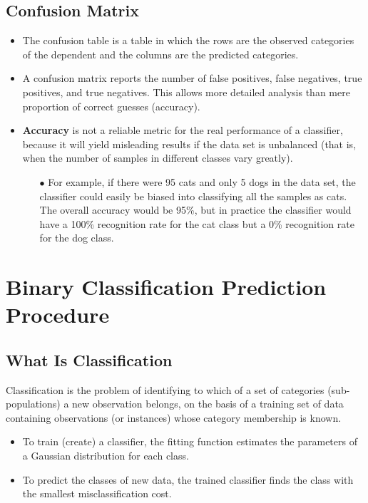 \documentclass[a4paper,12pt]{article}
\begin{document}
\subsection*{Confusion Matrix}
\begin{itemize}
	\item The confusion table is a table in which the rows are the observed categories of
	the dependent and the columns are the predicted categories. 
	\item A confusion matrix reports
	the number of false positives, false negatives, true positives, and true
	negatives. This allows more detailed analysis than mere proportion of correct guesses
	(accuracy). 
	\item \textbf{Accuracy} is not a reliable metric for the real performance of a
	classifier, because it will yield misleading results if the data set is unbalanced
	(that is, when the number of samples in different classes vary greatly).
	\begin{itemize}
		\item[$\bullet$] For example, if there were 95 cats and only 5 dogs in the data set, the
		classifier could easily be biased into classifying all the samples as cats. The
		overall accuracy would be 95\%, but in practice the classifier would have a
		100\% recognition rate for the cat class but a 0\% recognition rate for the dog
		class.
	\end{itemize}
\end{itemize}
	

	\section{Binary Classification Prediction Procedure} 

	\subsection*{What Is Classification}
	Classification is the problem of identifying to which of a set of categories
	(sub-populations) a new observation belongs, on the basis of a training set
	of data containing observations (or instances) whose category membership is
	known. 
	
	\begin{itemize}
		\item  To train (create) a classifier, the fitting function estimates the parameters
		of a Gaussian distribution for each class.
		\item  To predict the classes of new data, the trained classifier finds the class
		with the smallest misclassification cost.
	\end{itemize}
\end{document}
